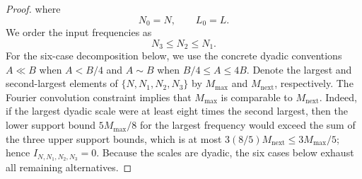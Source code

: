 \documentclass[12pt,oneside,reqno]{amsart}
\numberwithin{equation}{section}
\theoremstyle{plain}
\newcommand{\Ns}{{N,N_1,N_2,N_3}}
\begin{document}
\begin{proof}
where
\begin{equation}
    N_0=N,
    \qquad
    L_0=L.
\end{equation}
We order the input frequencies as
\begin{equation}
    N_3\leq N_2\leq N_1.
\end{equation}
For the six-case decomposition below, we use the concrete dyadic conventions
$A\ll B$ when $A<B/4$ and $A\sim B$ when $B/4\leq A\leq4B$.
Denote the largest and second-largest elements of $\{N,N_1,N_2,N_3\}$ by
$M_{\max}$ and $M_{\mathrm{next}}$, respectively. The Fourier convolution
constraint implies that $M_{\max}$ is comparable to $M_{\mathrm{next}}$.
Indeed, if the largest dyadic scale were at least eight times the second
largest, then the lower support bound $5M_{\max}/8$ for the largest frequency would exceed
the sum of the three upper support bounds, which is at most
$3(8/5)M_{\mathrm{next}}\leq3M_{\max}/5$; hence $I_{\Ns}=0$.
Because the scales are dyadic, the six cases below exhaust all remaining
alternatives.




\end{proof}
\end{document}
